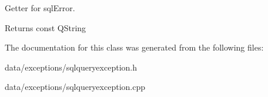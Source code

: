 \-Getter for sql\-Error. 

\begin{DoxyReturn}{\-Returns}
const \-Q\-String 
\end{DoxyReturn}


\-The documentation for this class was generated from the following files\-:\begin{DoxyCompactItemize}
\item 
data/exceptions/sqlqueryexception.\-h\item 
data/exceptions/sqlqueryexception.\-cpp\end{DoxyCompactItemize}
